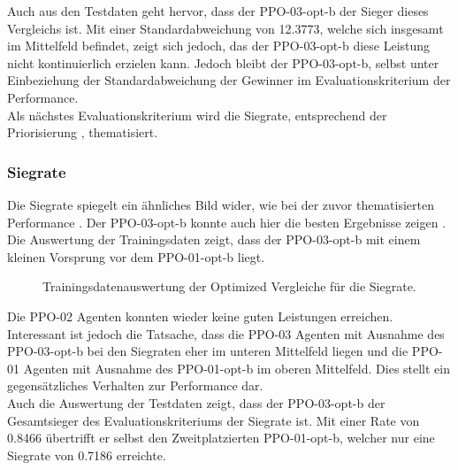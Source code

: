 Auch aus den Testdaten  geht hervor, dass der PPO-03-opt-b der Sieger dieses Vergleichs ist. Mit einer Standardabweichung von 12.3773, welche sich insgesamt im Mittelfeld befindet, zeigt sich jedoch, das der PPO-03-opt-b diese Leistung nicht kontinuierlich erzielen kann. Jedoch bleibt der PPO-03-opt-b, selbst unter Einbeziehung der Standardabweichung der Gewinner im Evaluationskriterium der Performance.\\
Als nächstes Evaluationskriterium wird die Siegrate, entsprechend der Priorisierung , thematisiert.

\subsubsection{Siegrate} \label{sec:Evaluation_Siegrate_Optimized}
Die Siegrate spiegelt ein ähnliches Bild wider, wie bei der zuvor thematisierten Performance . Der PPO-03-opt-b konnte auch hier die besten Ergebnisse zeigen . Die Auswertung der Trainingsdaten zeigt, dass der PPO-03-opt-b mit einem kleinen Vorsprung vor dem PPO-01-opt-b liegt.
\begin{figure}[H]
	\centering
	
	\caption[Siegrate - Auswertung der Trainingsdaten der Optimized Vergleiche]{Trainingsdatenauswertung der Optimized Vergleiche für die Siegrate.}
	\label{fig:Evaluation_Optimized_Winrate}
\end{figure}
Die PPO-02 Agenten konnten wieder keine guten Leistungen erreichen. Interessant ist jedoch die Tatsache, dass die PPO-03 Agenten mit Ausnahme des PPO-03-opt-b bei den Siegraten eher im unteren Mittelfeld liegen und die PPO-01 Agenten mit Ausnahme des PPO-01-opt-b im oberen Mittelfeld. Dies stellt ein gegensätzliches Verhalten zur Performance dar.\\
Auch die Auswertung der Testdaten  zeigt, dass der PPO-03-opt-b der Gesamtsieger des Evaluationskriteriums der Siegrate ist. Mit einer Rate von 0.8466 übertrifft er selbst den Zweitplatzierten PPO-01-opt-b, welcher nur eine Siegrate von 0.7186 erreichte.
